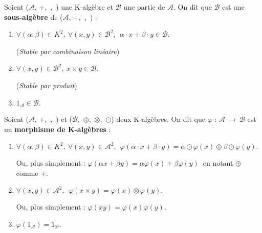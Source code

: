 \vspace{1.5cm}

Soient (\(\mathcal{A}\), +,\ \x,\ \lce) une K-algèbre et \(\mathcal{B}\) une partie de \(\mathcal{A}\). On dit que \(\mathcal{B}\) est une \textbf{sous-algèbre} de (\(\mathcal{A}\), +,\ \x,\ \lce) \ssi :\vspace{0.2cm}
\begin{enumerate}[leftmargin=2cm]
    \item \(\forall (\alpha,\beta)\in K^2,\ \forall (x,y)\in \mathcal{B}^2,\ \ \alpha\cdot x+\beta \cdot y \in \mathcal{B} \). \
    \begin{small}
        (\emph{Stable par combinaison linéaire})
    \end{small}\vspace{0.2cm}

    \item \(\forall (x,y)\in \mathcal{B}^2,\ x\times y\in \mathcal{B} \). \hspace{3.9cm}
    \begin{small}
        (\emph{Stable par produit})
    \end{small}\vspace{0.2cm}

    \item \(1_{\mathcal{A}}\in \mathcal{B}. \)
\end{enumerate}

\newpage

Soient (\(\mathcal{A}\), +,\ \x,\ \lce) et (\(\mathcal{B}\),\ \(\oplus\),\ \(\otimes\),\ $\odot$) deux K-algèbres. On dit que \(\varphi\) : \(\mathcal{A}\ \to \ \mathcal{B}\) est un \textbf{morphisme de K-algèbres} \ssi :\vspace{0.1cm}
\begin{enumerate}[leftmargin=2cm]
    \item \(\forall(\alpha,\beta)\in K^2,\ \forall(x,y)\in \mathcal{A}^2,\ \ \varphi (\alpha \cdot x + \beta \cdot y)=\alpha \odot \varphi (x) \oplus \beta \odot \varphi (y). \)\vspace{0.1cm}\\
    \begin{small}
        Ou, plus simplement : \(\varphi (\alpha x + \beta y) = \alpha \varphi (x) + \beta \varphi (y) \ \) en notant \(\oplus\) comme +.
    \end{small}\vspace{0.1cm}

    \item \(\forall (x,y)\in \mathcal{A}^2,\ \ \varphi (x\times y) = \varphi(x)\otimes \varphi(y).\)\vspace{0.1cm}\\
    \begin{small}
        Ou, plus simplement : \(\varphi(xy)=\varphi(x)\varphi(y)\).
    \end{small} \vspace{0.1cm}

    \item \(\varphi \left(1_{\mathcal{A}}\right) = 1_{\mathcal{B}}. \)
\end{enumerate}

